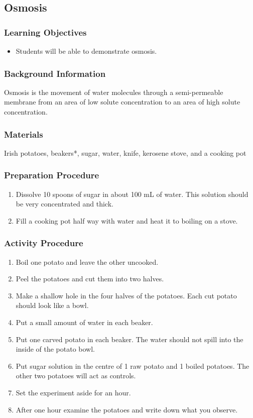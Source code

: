 \subsection{Osmosis}

\subsubsection*{Learning Objectives}
\begin{itemize}
\item{Students will be able to demonstrate osmosis.}
\end{itemize}

\subsubsection*{Background Information}
Osmosis is the movement of water molecules through a semi-permeable membrane from an area of low solute concentration to an area of high solute concentration.

\subsubsection*{Materials}
Irish potatoes, beakers*, sugar, water, knife, kerosene stove, and a cooking pot

\subsubsection*{Preparation Procedure}
\begin{enumerate}
\item{Dissolve 10 spoons of sugar in about 100 mL of water. This solution should be very concentrated and thick.}
\item{Fill a cooking pot half way with water and heat it to boiling on a stove.}
\end{enumerate}

\subsubsection*{Activity Procedure}
\begin{enumerate}
\item{Boil one potato and leave the other uncooked.}
\item{Peel the potatoes and cut them into two halves.}
\item{Make a shallow hole in the four halves of the potatoes. Each cut potato should look like a bowl.}
\item{Put a small amount of water in each beaker.}
\item{Put one carved potato in each beaker. The water should not spill into the inside of the potato bowl.}
\item{Put sugar solution in the centre of 1 raw potato and 1 boiled potatoes. The other two potatoes will act as controls.}
\item{Set the experiment aside for an hour.}
\item{After one hour examine the potatoes and write down what you observe.}
\end{enumerate}

